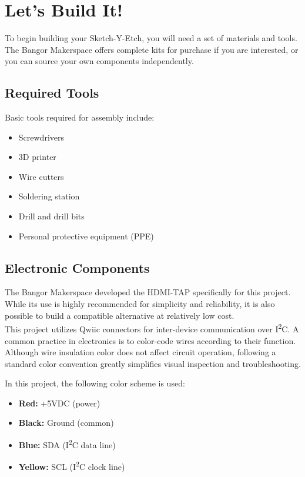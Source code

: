\documentclass[]{article}
\begin{document}
\section*{Let's Build It!}

To begin building your Sketch-Y-Etch, you will need a set of materials and tools.  
The Bangor Makerspace offers complete kits for purchase if you are interested, or you can source your own components independently.

\subsection*{Required Tools}

Basic tools required for assembly include:
\begin{itemize}
	\item Screwdrivers
	\item 3D printer
	\item Wire cutters
	\item Soldering station
	\item Drill and drill bits
	\item Personal protective equipment (PPE)
\end{itemize}

\subsection*{Electronic Components}

The Bangor Makerspace developed the HDMI-TAP specifically for this project. While its use is highly recommended for simplicity and reliability, it is also possible to build a compatible alternative at relatively low cost.\\

This project utilizes Qwiic connectors for inter-device communication over I\textsuperscript{2}C.  
A common practice in electronics is to color-code wires according to their function. Although wire insulation color does not affect circuit operation, following a standard color convention greatly simplifies visual inspection and troubleshooting.

In this project, the following color scheme is used:

\begin{itemize}
	\item \textbf{Red:} +5VDC (power)
	\item \textbf{Black:} Ground (common)
	\item \textbf{Blue:} SDA (I\textsuperscript{2}C data line)
	\item \textbf{Yellow:} SCL (I\textsuperscript{2}C clock line)
\end{itemize}
\end{document}
